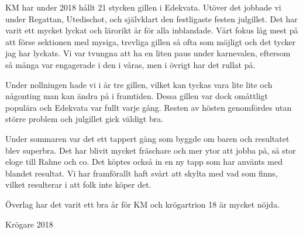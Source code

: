 \documentclass[../_main/handlingar.tex]{subfiles}
\begin{document}

KM har under 2018 hållt 21 stycken gillen i Edekvata. Utöver det jobbade vi under Regattan,
Utedischot, och självklart den festligaste festen julgillet. Det har varit ett mycket lyckat och lärorikt år
för alla inblandade. Vårt fokus låg mest på att förse sektionen med mysiga, trevliga gillen så ofta som
möjligt och det tycker jag har lyckats. Vi var tvungna att ha en liten paus under karnevalen, eftersom
så många var engagerade i den i våras, men i övrigt har det rullat på.

Under nollningen hade vi i år tre gillen, vilket kan tyckas vara lite lite och någonting man kan ändra på
i framtiden. Dessa gillen var dock omåttligt populära och Edekvata var fullt varje gång. Resten av
hösten genomfördes utan större problem och julgillet gick väldigt bra.

Under sommaren var det ett tappert gäng som byggde om baren och resultatet blev superbra. Det har blivit mycket fräschare och mer ytor att jobba på, så stor eloge till Rahne och co. Det köptes också in en ny tapp som har använts med blandet resultat. Vi har framförallt haft svårt att skylta med vad som finns, vilket resulterar i att folk inte köper det.  

Överlag har det varit ett bra år för KM och krögartrion 18 är mycket nöjda.

\begin{signatures}{1}
    \mvh
    \signature{Malin Heyden}{Krögare 2018}
\end{signatures}
\end{document}

